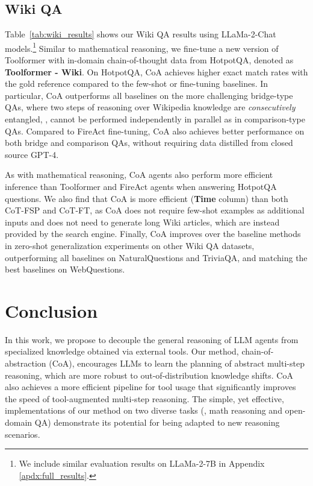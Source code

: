 \subsection{Wiki QA}
\label{wiki_qa_exp}
Table~\ref{tab:wiki_results} shows our Wiki QA results using LLaMa-2-Chat models.\footnote{We include similar evaluation results on LLaMa-2-7B in Appendix \ref{apdx:full_results}.}
Similar to mathematical reasoning, we fine-tune a new version of Toolformer with in-domain chain-of-thought data from HotpotQA, denoted as \textbf{Toolformer - Wiki}.
On HotpotQA, CoA achieves higher exact match rates with the gold reference compared to the few-shot or fine-tuning baselines.
In particular, CoA outperforms all baselines on the more challenging bridge-type QAs, where two steps of reasoning over Wikipedia knowledge are \textit{consecutively} entangled, \ie{}, cannot be performed independently in parallel as in comparison-type QAs. 
Compared to FireAct fine-tuning, CoA also achieves better performance on both bridge and comparison QAs, without requiring data distilled from closed source GPT-4.

As with mathematical reasoning, CoA agents also perform more efficient inference than Toolformer and FireAct agents when answering HotpotQA questions.
We also find that CoA is more efficient (\textbf{Time} column) than both CoT-FSP and CoT-FT, as CoA does not require few-shot examples as additional inputs and does not need to generate long Wiki articles, which are instead provided by the search engine.
Finally, CoA improves over the baseline methods in zero-shot generalization experiments on other Wiki QA datasets, outperforming all baselines on NaturalQuestions and TriviaQA, and matching the best baselines on WebQuestions.

\section{Conclusion}
In this work, we propose to decouple the general reasoning of LLM agents from specialized knowledge obtained via external tools.
Our method, chain-of-abstraction (CoA), encourages LLMs to learn the planning of abstract multi-step reasoning, which are more robust to out-of-distribution knowledge shifts.
CoA also achieves a more efficient pipeline for tool usage that significantly improves the speed of tool-augmented multi-step reasoning.
The simple, yet effective, implementations of our method on two diverse tasks (\ie{}, math reasoning and open-domain QA) demonstrate its potential for being adapted to new reasoning scenarios.

